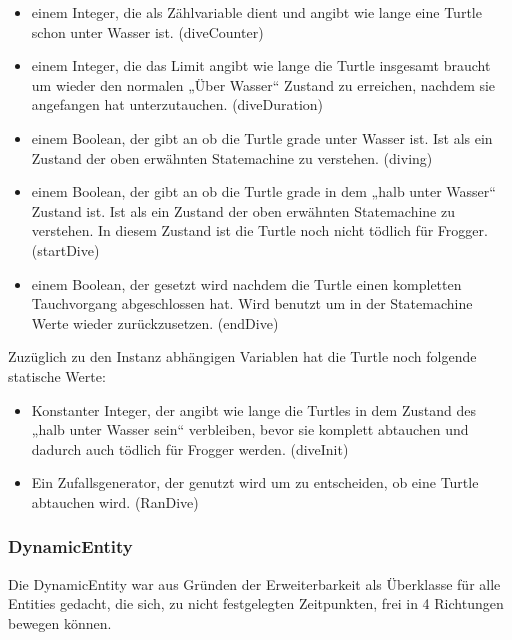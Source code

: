 \documentclass[a4paper,10pt]{report}
\begin{document}
{{{{					\begin{itemize}
						\item einem Integer, die als Zählvariable dient und angibt wie lange eine Turtle schon unter Wasser ist. (diveCounter)
						\item einem Integer, die das Limit angibt wie lange die Turtle insgesamt braucht um wieder den normalen „Über Wasser“ Zustand zu erreichen, nachdem sie angefangen hat unterzutauchen. (diveDuration)
						\item einem Boolean, der gibt an ob die Turtle grade unter Wasser ist. Ist als ein Zustand der oben erwähnten Statemachine zu verstehen. (diving)
						\item einem Boolean, der gibt an ob die Turtle grade in dem „halb unter Wasser“ Zustand ist. Ist als ein Zustand der oben erwähnten Statemachine zu verstehen. 
						      In diesem Zustand ist die Turtle noch nicht tödlich für Frogger. (startDive)
						\item einem Boolean, der gesetzt wird nachdem die Turtle einen kompletten Tauchvorgang abgeschlossen hat. Wird benutzt um in der Statemachine Werte wieder zurückzusetzen. (endDive)
					\end{itemize}
					\noindent
					Zuzüglich zu den Instanz abhängigen Variablen hat die Turtle noch folgende statische Werte:
					\begin{itemize}
						\item Konstanter Integer, der angibt wie lange die Turtles in dem Zustand des „halb unter Wasser sein“ verbleiben, bevor sie komplett abtauchen und dadurch auch tödlich für Frogger werden. (diveInit)
						\item Ein Zufallsgenerator, der genutzt wird um zu entscheiden, ob eine Turtle abtauchen wird. (RanDive)
					\end{itemize}
				}							
			}	
			
			
			\subsubsection{DynamicEntity}
			{
				\label{sssec:dynamicentityclass}
				
				Die DynamicEntity war aus Gründen der Erweiterbarkeit als Überklasse für alle Entities gedacht, die sich, zu nicht festgelegten Zeitpunkten, frei in 4 Richtungen bewegen können.
				\newpage 
}}}
\end{document}
